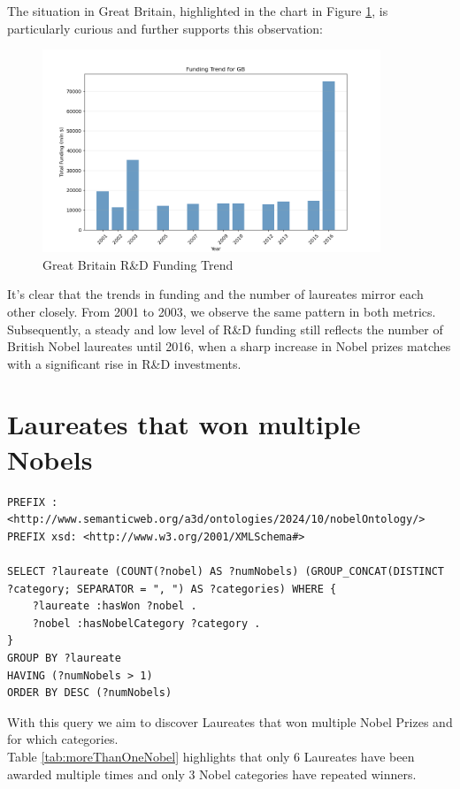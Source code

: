 \documentclass{article}
\begin{document}
The situation in Great Britain, highlighted in the chart in Figure \ref{fig:gb_fundings}, is particularly curious
and further supports this observation:

\begin{figure}[H]
	\centering
	\includegraphics[width=0.9\textwidth]{../queries/plots/gb_funding_trend_bar.png}
	\caption{Great Britain R\&D Funding Trend}
	\label{fig:gb_fundings}
\end{figure}

It's clear that the trends in funding and the number of laureates mirror each other closely. From 2001 to 2003,
we observe the same pattern in both metrics. Subsequently, a steady and low level of R\&D funding still reflects
the number of British Nobel laureates until 2016, when a sharp increase in Nobel prizes matches with a significant
rise in R\&D investments.

\section{Laureates that won multiple Nobels}

\begin{lstlisting}
PREFIX : <http://www.semanticweb.org/a3d/ontologies/2024/10/nobelOntology/>
PREFIX xsd: <http://www.w3.org/2001/XMLSchema#>

SELECT ?laureate (COUNT(?nobel) AS ?numNobels) (GROUP_CONCAT(DISTINCT ?category; SEPARATOR = ", ") AS ?categories) WHERE {
    ?laureate :hasWon ?nobel .
    ?nobel :hasNobelCategory ?category .
}
GROUP BY ?laureate
HAVING (?numNobels > 1)
ORDER BY DESC (?numNobels)
\end{lstlisting}
With this query we aim to discover Laureates that won multiple Nobel Prizes and for which categories.\\
Table \ref{tab:moreThanOneNobel} highlights that only 6 Laureates have been awarded multiple times and only 3
Nobel categories have repeated winners.
\end{document}
